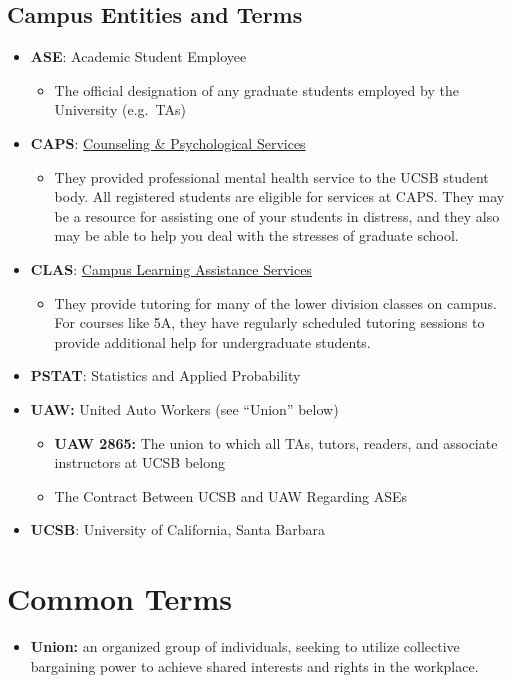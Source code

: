 \documentclass[
  letterpaper,
  DIV=11,
  numbers=noendperiod]{scrreprt}
\providecommand{\tightlist}{%
  \setlength{\itemsep}{0pt}\setlength{\parskip}{0pt}}\usepackage{longtable,booktabs,array}
\begin{document}
\hypertarget{campus-entities-and-terms}{%
\subsection{Campus Entities and Terms}\label{campus-entities-and-terms}}

\begin{itemize}
\item
  \textbf{ASE}: Academic Student Employee

  \begin{itemize}
  \tightlist
  \item
    The official designation of any graduate students employed by the
    University (e.g.~TAs)
  \end{itemize}
\item
  \textbf{CAPS}: \href{https://caps.sa.ucsb.edu/}{Counseling \&
  Psychological Services}

  \begin{itemize}
  \tightlist
  \item
    They provided professional mental health service to the UCSB student
    body. All registered students are eligible for services at CAPS.
    They may be a resource for assisting one of your students in
    distress, and they also may be able to help you deal with the
    stresses of graduate school.
  \end{itemize}
\item
  \textbf{CLAS}: \href{https://clas.sa.ucsb.edu/}{Campus Learning
  Assistance Services}

  \begin{itemize}
  \tightlist
  \item
    They provide tutoring for many of the lower division classes on
    campus. For courses like 5A, they have regularly scheduled tutoring
    sessions to provide additional help for undergraduate students.
  \end{itemize}
\item
  \textbf{PSTAT}: Statistics and Applied Probability
\item
  \textbf{UAW:} United Auto Workers (see ``Union'' below)

  \begin{itemize}
  \item
    \textbf{UAW 2865:} The union to which all TAs, tutors, readers, and
    associate instructors at UCSB belong
  \item
    The Contract Between UCSB and UAW Regarding ASEs
  \end{itemize}
\item
  \textbf{UCSB}: University of California, Santa Barbara
\end{itemize}

\hypertarget{common-terms}{%
\section{Common Terms}\label{common-terms}}

\begin{itemize}
\tightlist
\item
  \textbf{Union:} an organized group of individuals, seeking to utilize
  collective bargaining power to achieve shared interests and rights in
  the workplace.
\end{itemize}
\end{document}
